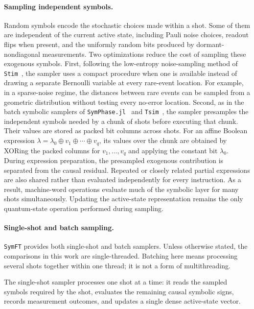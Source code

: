 \documentclass[a4paper,onecolumn,unpublished]{quantumarticle}
\newcommand{\tFont}[1]{\texttt{#1}}
\newcommand{\symft}{\tFont{SymFT}}
\newcommand{\stim}{\tFont{Stim}}
\newcommand{\tsim}{\tFont{Tsim}}
\newcommand{\symphase}{\tFont{SymPhase.jl}}
\begin{document}
\paragraph{Sampling independent symbols.}
Random symbols encode the stochastic choices made within a shot.
Some of them are independent of the current active state, including Pauli noise choices, readout flips when present, and the uniformly random bits produced by dormant-nondiagonal measurements.
Two optimizations reduce the cost of sampling these exogenous symbols.
First, following the low-entropy noise-sampling method of \stim{}~\cite{Gidney21}, the sampler uses a compact procedure when one is available instead of drawing a separate Bernoulli variable at every rare-event location.
For example, in a sparse-noise regime, the distances between rare events can be sampled from a geometric distribution without testing every no-error location.
Second, as in the batch symbolic samplers of
\symphase{}~\cite{FY24b} and \tsim{}~\cite{HLZ26}, the sampler presamples the independent symbols needed by a chunk of shots before executing that chunk.
Their values are stored as packed bit columns across shots.
For an affine Boolean expression $\lambda = \lambda_0 \oplus v_1 \oplus \cdots \oplus v_q$, its values over the chunk are obtained by XORing the packed columns for $v_1,\ldots,v_q$ and applying the constant bit $\lambda_0$.
During expression preparation, the presampled exogenous contribution is separated from the causal residual.
Repeated or closely related partial expressions are also shared rather than evaluated independently for every instruction.
As a result, machine-word operations evaluate much of the symbolic layer for many shots simultaneously.
Updating the active-state representation remains the only quantum-state operation performed during sampling.


\paragraph{Single-shot and batch sampling.}
\symft{} provides both single-shot and batch samplers.
Unless otherwise stated, the comparisons in this work are single-threaded.
Batching here means processing several shots together within one thread; it is not a form of multithreading.

The single-shot sampler processes one shot at a time: it reads the sampled symbols required by the shot, evaluates the remaining causal symbolic signs, records measurement outcomes, and updates a single dense active-state vector.
\end{document}
